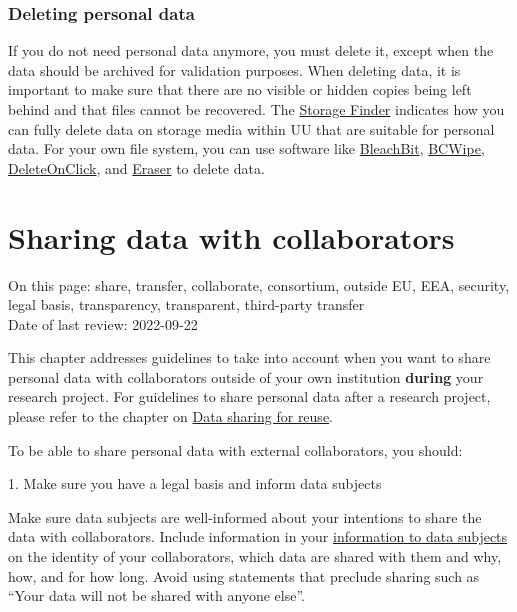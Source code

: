 \documentclass[
]{book}
\begin{document}
\hypertarget{deleting-personal-data}{%
\subsection{Deleting personal data}\label{deleting-personal-data}}

If you do not need personal data anymore, you must delete it, except when the data
should be archived for validation purposes. When deleting data, it is important
to make sure that there are no visible or hidden copies being left behind and
that files cannot be recovered. The
\href{https://tools.uu.nl/storagefinder/}{Storage Finder}
indicates how you can fully delete data on storage media within UU that are
suitable for personal data. For your own file system, you can use software like
\href{https://www.bleachbit.org/}{BleachBit},
\href{https://www.jetico.com/data-wiping/wipe-files-bcwipe}{BCWipe},
\href{https://www.2brightsparks.com/onclick/help/welcomedeleteonclick.htm}{DeleteOnClick},
and \href{https://eraser.heidi.ie/}{Eraser} to delete data.

\hypertarget{data-sharing-collaboration}{%
\chapter{Sharing data with collaborators}\label{data-sharing-collaboration}}

On this page: share, transfer, collaborate, consortium, outside EU, EEA,
security, legal basis, transparency, transparent, third-party transfer\\
Date of last review: 2022-09-22

This chapter addresses guidelines to take into account when you want to share
personal data with collaborators outside of your own institution \textbf{during}
your research project. For guidelines to share personal data after a research
project, please refer to the chapter on \protect\hyperlink{data-sharing-reuse}{Data sharing for reuse}.

To be able to share personal data with external collaborators, you should:

1. Make sure you have a legal basis and
inform data subjects

Make sure data subjects are well-informed about your intentions to
share the data with collaborators. Include information in your
\protect\hyperlink{privacy-notices}{information to data subjects} on the identity of your
collaborators, which data are shared with them and why, how, and for how
long. Avoid using statements that preclude sharing such as ``Your data
will not be shared with anyone else''.
\end{document}
